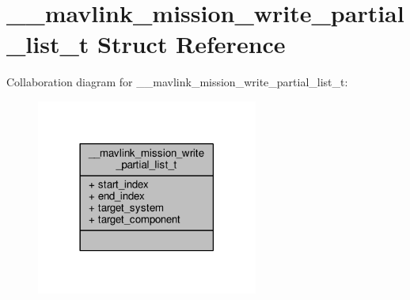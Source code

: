 \hypertarget{struct____mavlink__mission__write__partial__list__t}{\section{\+\_\+\+\_\+mavlink\+\_\+mission\+\_\+write\+\_\+partial\+\_\+list\+\_\+t Struct Reference}
\label{struct____mavlink__mission__write__partial__list__t}
}


Collaboration diagram for \+\_\+\+\_\+mavlink\+\_\+mission\+\_\+write\+\_\+partial\+\_\+list\+\_\+t\+:
\nopagebreak
\begin{figure}[H]
\begin{center}
\leavevmode
\includegraphics[width=206pt]{struct____mavlink__mission__write__partial__list__t__coll__graph}
\end{center}
\end{figure}
